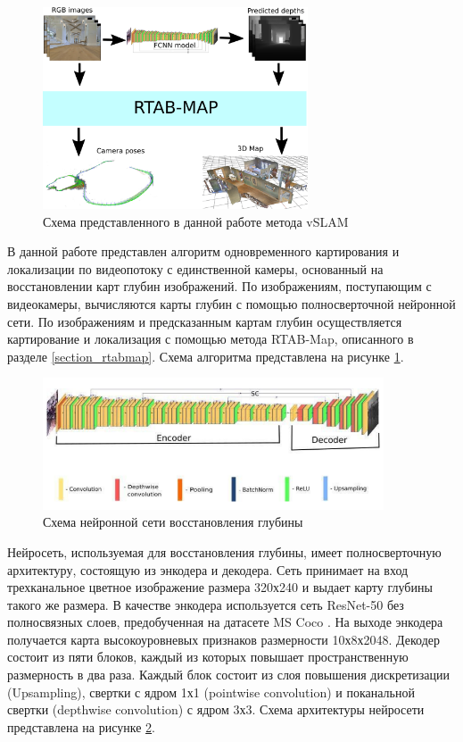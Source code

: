 \documentclass{mipt-thesis-ms}
\begin{document}
	\begin{figure}
		\centering
		\includegraphics[width=0.7\textwidth]{img/slam_scheme.png}
		\caption{Схема представленного в данной работе метода vSLAM}
		\label{figure_our_slam_pipeline}
	\end{figure}
	
	В данной работе представлен алгоритм одновременного картирования и локализации по видеопотоку с единственной камеры, основанный на восстановлении карт глубин изображений. По изображениям, поступающим с видеокамеры, вычисляются карты глубин с помощью полносверточной нейронной сети. По изображениям и предсказанным картам глубин осуществляется картирование и локализация с помощью метода RTAB-Map, описанного в разделе \ref{section_rtabmap}. Схема алгоритма представлена на рисунке \ref{figure_our_slam_pipeline}.
	
	\begin{figure}
		\centering
		\includegraphics[width=0.9\textwidth]{img/fcnn_scheme.png}
		\caption{Схема нейронной сети восстановления глубины}
		\label{figure_our_fcnn}
	\end{figure}
	
	Нейросеть, используемая для восстановления глубины, имеет полносверточную архитектуру, состоящую из энкодера и декодера. Сеть принимает на вход трехканальное цветное изображение размера 320х240 и выдает карту глубины такого же размера. В качестве энкодера используется сеть ResNet-50 \cite{he2016deep} без полносвязных слоев, предобученная на датасете MS Coco \cite{lin2014microsoft}. На выходе энкодера получается карта высокоуровневых признаков размерности 10х8х2048. Декодер состоит из пяти блоков, каждый из которых повышает пространственную размерность в два раза. Каждый блок состоит из слоя повышения дискретизации (Upsampling), свертки с ядром 1х1 (pointwise convolution) и поканальной свертки (depthwise convolution) с ядром 3х3. Схема архитектуры нейросети представлена на рисунке \ref{figure_our_fcnn}.
	
\end{document}
